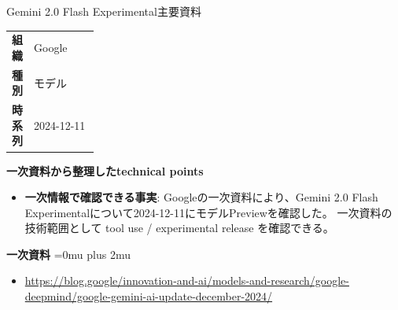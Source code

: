 \begin{technicalnote}{Gemini 2.0 Flash Experimental}{主要資料}
\begingroup
\begin{tabularx}{\linewidth}{@{}>{\bfseries}p{0.22\linewidth}X@{}}
組織 & Google \\
種別 & モデル \\
時系列 & 2024-12-11 \\
\end{tabularx}
\smallskip
{\bfseries 一次資料から整理したtechnical points}
\begin{itemize}[leftmargin=1.5em,itemsep=0.35em]
\item \textbf{一次情報で確認できる事実}: Googleの一次資料により、Gemini 2.0 Flash Experimentalについて2024-12-11にモデルPreviewを確認した。 一次資料の技術範囲として tool use / experimental release を確認できる。
\end{itemize}
\begin{minipage}{\linewidth}
\begin{samepage}
{\bfseries 一次資料}
\begingroup\sloppy
\Urlmuskip=0mu plus 2mu\relax
\begin{itemize}[leftmargin=1.5em,itemsep=0.25em]
\item {\scriptsize\url{https://blog.google/innovation-and-ai/models-and-research/google-deepmind/google-gemini-ai-update-december-2024/}}
\end{itemize}
\endgroup
\end{samepage}
\end{minipage}
\endgroup
\end{technicalnote}
\medskip

